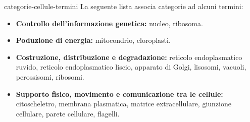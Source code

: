 \documentclass[preview]{standalone}
\begin{document}
\begin{snippet}{categorie-cellule-termini}
    La seguente lista associa categorie ad alcuni termini:
    \begin{itemize}
        \item \textbf{Controllo dell'informazione genetica:}
            nucleo, ribosoma.
        \item \textbf{Poduzione di energia:}
            mitocondrio, cloroplasti.
        \item \textbf{Costruzione, distribuzione e degradazione:}
            reticolo endoplasmatico ruvido,
            reticolo endoplasmatico liscio, apparato di Golgi,
            lisosomi, vacuoli, perossisomi, ribosomi.
        \item \textbf{Supporto fisico, movimento e comunicazione tra le cellule:}
            citoscheletro, membrana plasmatica, matrice extracellulare,
            giunzione cellulare, parete cellulare, flagelli.
    \end{itemize}
\end{snippet}
\end{document}
